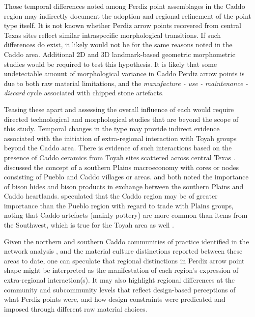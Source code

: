 \documentclass[review]{elsarticle}
\begin{document}
Those temporal differences noted among Perdiz point assemblages in the Caddo region may indirectly document the adoption and regional refinement of the point type itself. It is not known whether Perdiz arrow points recovered from central Texas sites reflect similar intraspecific morphological transitions. If such differences do exist, it likely would not be for the same reasons noted in the Caddo area. Additional 2D and 3D landmark-based geometric morphometric studies would be required to test this hypothesis. It is likely that some undetectable amount of morphological variance in Caddo Perdiz arrow points is due to both raw material limitations, and the \textit{manufacture - use - maintenance - discard} cycle associated with chipped stone artefacts. 

Teasing these apart and assessing the overall influence of each would require directed technological and morphological studies that are beyond the scope of this study. Temporal changes in the type may provide indirect evidence associated with the initiation of extra-regional interaction with Toyah groups beyond the Caddo area. There is evidence of such interactions based on the presence of Caddo ceramics from Toyah sites scattered across central Texas \citep{RN9001}. \citet{RN6910} discussed the concept of a southern Plains macroeconomy with cores or nodes consisting of Pueblo and Caddo villages or areas. \citet{RN6046} and \citet{RN6910} both noted the importance of bison hides and bison products in exchange between the southern Plains and Caddo heartlands. \citet{RN6910} speculated that the Caddo region may be of greater importance than the Pueblo region with regard to trade with Plains groups, noting that Caddo artefacts (mainly pottery) are more common than items from the Southwest, which is true for the Toyah area as well \citep{RN8999}.

Given the northern and southern Caddo communities of practice identified in the network analysis \citep{RN8031}, and the material culture distinctions reported between these areas to date, one can speculate that regional distinctions in Perdiz arrow point shape might be interpreted as the manifestation of each region's expression of extra-regional interaction(s). It may also highlight regional differences at the community and subcommunity levels that reflect design-based perceptions of what Perdiz points were, and how design constraints were predicated and imposed through different raw material choices.
\end{document}
